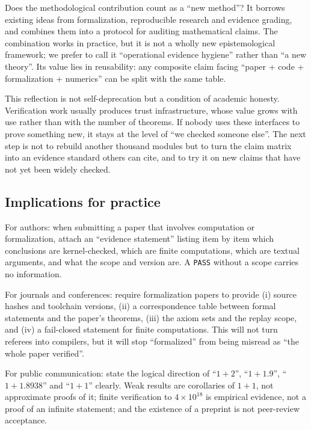 \documentclass[11pt,a4paper]{article}
\theoremstyle{plain}
\theoremstyle{definition}
\begin{document}
Does the methodological contribution count as a ``new method''? It borrows existing ideas from formalization, reproducible research and evidence grading, and combines them into a protocol for auditing mathematical claims. The combination works in practice, but it is not a wholly new epistemological framework; we prefer to call it ``operational evidence hygiene'' rather than ``a new theory''. Its value lies in reusability: any composite claim facing ``paper + code + formalization + numerics'' can be split with the same table.

This reflection is not self-deprecation but a condition of academic honesty. Verification work usually produces trust infrastructure, whose value grows with use rather than with the number of theorems. If nobody uses these interfaces to prove something new, it stays at the level of ``we checked someone else''. The next step is not to rebuild another thousand modules but to turn the claim matrix into an evidence standard others can cite, and to try it on new claims that have not yet been widely checked.

\subsection{Implications for practice}
\label{sec:implications}

For authors: when submitting a paper that involves computation or formalization, attach an ``evidence statement'' listing item by item which conclusions are kernel-checked, which are finite computations, which are textual arguments, and what the scope and version are. A \texttt{PASS} without a scope carries no information.

For journals and conferences: require formalization papers to provide (i) source hashes and toolchain versions, (ii) a correspondence table between formal statements and the paper's theorems, (iii) the axiom sets and the replay scope, and (iv) a fail-closed statement for finite computations. This will not turn referees into compilers, but it will stop ``formalized'' from being misread as ``the whole paper verified''.

For public communication: state the logical direction of ``$1+2$'', ``$1+1.9$'', ``$1+1.8938$'' and ``$1+1$'' clearly. Weak results are corollaries of $1+1$, not approximate proofs of it; finite verification to $4\times10^{18}$ is empirical evidence, not a proof of an infinite statement; and the existence of a preprint is not peer-review acceptance.
\end{document}
